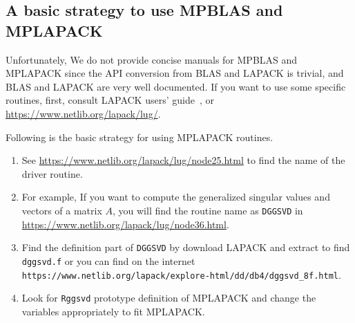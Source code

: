\documentclass[12pt]{article}
\begin{document}
\subsection{A basic strategy to use MPBLAS and MPLAPACK}

Unfortunately, We do not provide concise manuals for MPBLAS and MPLAPACK since the API conversion from BLAS and LAPACK is trivial, and BLAS and LAPACK are very well documented. If you want to use some specific routines,
first, consult LAPACK users' guide~\cite{laug}, or \url{https://www.netlib.org/lapack/lug/}.

Following is the basic strategy for using MPLAPACK routines.
\begin{enumerate}
\item See \url{https://www.netlib.org/lapack/lug/node25.html} to find the name of the driver routine.
\item For example, If you want to compute the generalized singular values and vectors of a matrix $A$, you will find the routine name as {\tt DGGSVD} in \url{https://www.netlib.org/lapack/lug/node36.html}.
\item Find the definition part of {\tt DGGSVD} by download LAPACK and extract to find {\tt dggsvd.f} or you can find on the internet {\tt https://www.netlib.org/lapack/explore-html/dd/db4/dggsvd\_8f.html}.
\item Look for {\tt Rggsvd} prototype definition of MPLAPACK and change the variables appropriately to fit MPLAPACK.
\end{enumerate}
\end{document}
